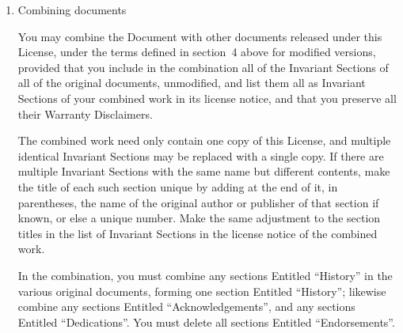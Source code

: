\begin{enumerate}
You may add a section Entitled ``Endorsements'', provided it contains
nothing but endorsements of your Modified Version by various
parties---for example, statements of peer review or that the text has
been approved by an organization as the authoritative definition of a
standard.

You may add a passage of up to five words as a Front-Cover Text, and a
passage of up to 25 words as a Back-Cover Text, to the end of the list
of Cover Texts in the Modified Version.  Only one passage of
Front-Cover Text and one of Back-Cover Text may be added by (or
through arrangements made by) any one entity.  If the Document already
includes a cover text for the same cover, previously added by you or
by arrangement made by the same entity you are acting on behalf of,
you may not add another; but you may replace the old one, on explicit
permission from the previous publisher that added the old one.

The author(s) and publisher(s) of the Document do not by this License
give permission to use their names for publicity for or to assert or
imply endorsement of any Modified Version.

\item Combining documents

You may combine the Document with other documents released under this
License, under the terms defined in section~4 above for modified
versions, provided that you include in the combination all of the
Invariant Sections of all of the original documents, unmodified, and
list them all as Invariant Sections of your combined work in its
license notice, and that you preserve all their Warranty Disclaimers.

The combined work need only contain one copy of this License, and
multiple identical Invariant Sections may be replaced with a single
copy.  If there are multiple Invariant Sections with the same name but
different contents, make the title of each such section unique by
adding at the end of it, in parentheses, the name of the original
author or publisher of that section if known, or else a unique number.
Make the same adjustment to the section titles in the list of
Invariant Sections in the license notice of the combined work.

In the combination, you must combine any sections Entitled ``History''
in the various original documents, forming one section Entitled
``History''; likewise combine any sections Entitled ``Acknowledgements'',
and any sections Entitled ``Dedications''.  You must delete all sections
Entitled ``Endorsements''.


\end{enumerate}
